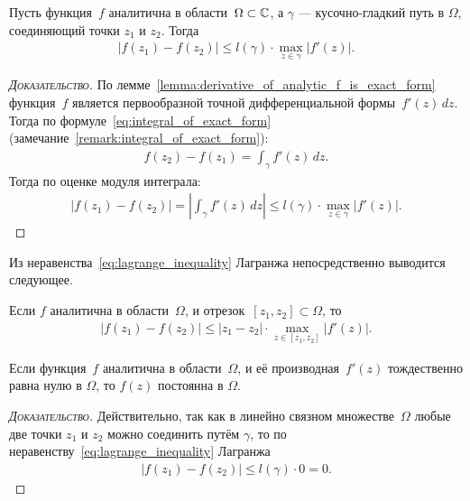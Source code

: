 \documentclass[../complex-analysis.tex]{subfiles}
\begin{document}
\begin{thm}
 \label{theorem:Lagrange_inequality}
 Пусть функция~$ f $ аналитична в области~$ \Omega \subset \mathbb{C}$, а $ \gamma $ --- кусочно-гладкий путь в $ \Omega $, соединяющий точки $ z_1 $ и $ z_2 $. Тогда
 \begin{align}
  \label{eq:lagrange_inequality}
  \left| f(z_1) - f(z_2) \right| \leqslant l(\gamma) \cdot \max_{z \in \gamma} \left| f'(z) \right|.
 \end{align} 
\end{thm}
\begin{proof}[\normalfont\textsc{Доказательство}]
 По лемме~\ref{lemma:derivative_of_analytic_f_is_exact_form} функция~$ f $ является первообразной точной дифференциальной формы~$ f'(z)\,dz $. Тогда по формуле~\eqref{eq:integral_of_exact_form} (замечание~\ref{remark:integral_of_exact_form}):
 \begin{align*}
  f(z_2) - f(z_1) = \int_{\gamma} f'(z)\,dz. 
 \end{align*} Тогда по оценке модуля интеграла:
 \begin{align*}
  \left| f(z_1) - f(z_2) \right| = \left| \int_{\gamma} f'(z)\,dz  \right| \leqslant l(\gamma) \cdot \max_{z \in \gamma} \left| f'(z) \right|.
 \end{align*}
\end{proof}

Из неравенства~\eqref{eq:lagrange_inequality} Лагранжа непосредственно выводится следующее.

\begin{remrk}
 Если $ f $ аналитична в области~$ \Omega $, и отрезок~$ [z_1,z_2] \subset \Omega$, то
 \begin{align*}
  \left| f(z_1) - f(z_2) \right| \leqslant \left| z_1-z_2 \right| \cdot \max_{z \in [z_1, z_2]} \left| f'(z) \right|.
 \end{align*}
\end{remrk}

\begin{remrk}
 \label{remark:zero_derivative_analytical}
 Если функция~$ f $ аналитична в области~$ \Omega $, и её производная~$ f'(z) $ тождественно равна нулю в $ \Omega $, то $ f(z) $ постоянна в $ \Omega $.
\end{remrk}
\begin{proof}[\normalfont\textsc{Доказательство}]
 Действительно, так как в линейно связном множестве~$ \Omega $ любые две точки $ z_1 $ и $ z_2 $ можно соединить путём $ \gamma $, то по неравенству~\eqref{eq:lagrange_inequality} Лагранжа
 \begin{align*}
  \left| f(z_1)-f(z_2) \right| \leqslant l(\gamma) \cdot 0 = 0.
 \end{align*}
\end{proof}
\end{document}

